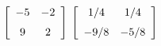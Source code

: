 {$\left[ \begin {array}{cc} -5&-2\\\noalign{\medskip}9&2\end {array}
 \right] $
 }
{$\left[ \begin {array}{cc} 1/4&1/4\\\noalign{\medskip}-9/8&-5/8\end {array}
 \right] $}
